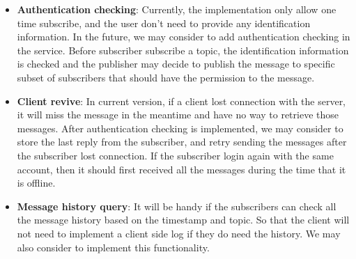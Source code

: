\begin{itemize}
    \item \textbf{Authentication checking}: Currently, the implementation only allow one time subscribe, and the user don't need to provide any identification information. In the future, we may consider to add authentication checking in the service. Before subscriber subscribe a topic, the identification information is checked and the publisher may decide to publish the message to specific subset of subscribers that should have the permission to the message.
    \item \textbf{Client revive}: In current version, if a client lost connection with the server, it will miss the message in the meantime and have no way to retrieve those messages. After authentication checking is implemented, we may consider to store the last reply from the subscriber, and retry sending the messages after the subscriber lost connection. If the subscriber login again with the same account, then it should first received all the messages during the time that it is offline.
    \item \textbf{Message history query}: It will be handy if the subscribers can check all the message history based on the timestamp and topic. So that the client will not need to implement a client side log if they do need the history. We may also consider to implement this functionality.
\end{itemize}
